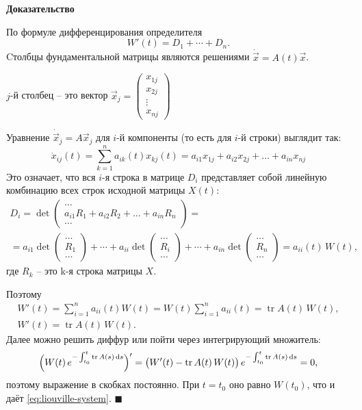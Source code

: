 \documentclass[12pt,a4paper]{article}
\numberwithin{equation}{section}
\newcommand{\vect}[1]{\vec{#1}}
\newcommand{\tr}{\operatorname{tr}}
\newcommand{\dd}{\mathop{}\!\mathrm{d}}
\renewenvironment{proof}[1][Доказательство]{\begin{center}\textbf{#1}\end{center}}{\hfill$\blacksquare$\par}
\begin{document}
\begin{proof}
По формуле дифференцирования определителя
\[
W'(t)=D_1+\cdots+D_n.
\]
Cтолбцы фундаментальной матрицы являются решениями \(\dot{\vect{x}}=A(t)\vect{x}\).

\(j\)-й столбец -- это вектор \(\vect{x}_j=\begin{pmatrix}x_{1j}\\x_{2j}\\\vdots\\x_{nj}\end{pmatrix}\)

Уравнение \(\dot{\vect{x}}_j=A\vect{x}_j\) для \(i\)-й компоненты (то есть для \(i\)-й строки) выглядит так:
\[\dot{x}_{ij}(t)=\sum_{k=1}^na_{ik}(t)x_{kj}(t) = a_{i1}x_{1j} + a_{i2}x_{2j} + \ldots + a_{in}x_{nj}\]
Это означает, что вся \(i\)-я строка в матрице \(D_i\) представляет собой линейную комбинацию всех строк исходной матрицы \(X(t)\):
\begin{gather*}
D_i=\det\begin{pmatrix}\ldots\\a_{i1}R_1+a_{i2}R_2+\ldots+a_{in}R_n\\\ldots\end{pmatrix}=\\= a_{i1} \det \begin{pmatrix} \dots \\ R_1 \\ \dots \end{pmatrix} + \cdots + a_{ii} \det \begin{pmatrix} \dots \\ R_i \\ \dots \end{pmatrix} + \cdots + a_{in} \det \begin{pmatrix} \dots \\ R_n \\ \dots \end{pmatrix}=a_{ii}(t)\,W(t),
\end{gather*}
где \(R_k\) -- это k-я строка матрицы \(X\).

Поэтому
\begin{gather*}
W'(t)=\sum_{i=1}^{n}a_{ii}(t)W(t)=W(t)\sum_{i=1}^{n}a_{ii}(t)=\tr A(t)\,W(t),\\
W'(t)=\tr A(t)\,W(t).
\end{gather*}
Далее можно решить диффур или пойти через интегрирующий множитель:
\[
\Bigl(W(t)\,e^{-\int_{t_0}^{t}\operatorname{tr}A(s)\dd s}\Bigr)'
=\bigl(W'(t)-\operatorname{tr}A(t)\,W(t)\bigr)\,e^{-\int_{t_0}^{t}\operatorname{tr}A(s)\dd s}=0,
\]
поэтому выражение в скобках постоянно. При $t=t_0$ оно равно $W(t_0)$, что и даёт \eqref{eq:liouville-system}.
\end{proof}
\end{document}

